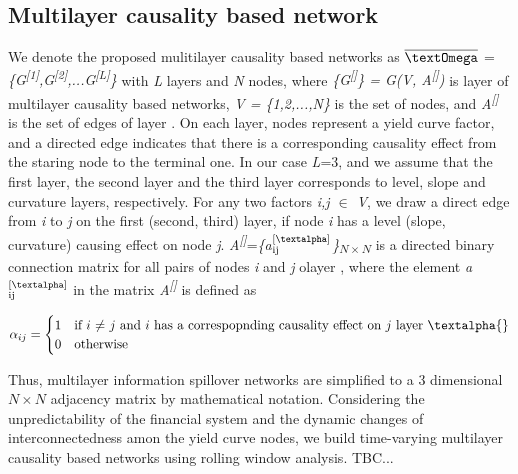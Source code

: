 \documentclass{article}
\begin{document}
\subsection{Multilayer causality based network}

We denote the proposed mulitilayer causality based networks as $\overline{\mbox{\textOmega}}$ = \textit{\{G\textsuperscript{[1]},G\textsuperscript{[2]},...G\textsuperscript{[L]}\}}
with \textit{L} layers and \textit{N} nodes, where \textit{\{G\textsuperscript{[\textalpha]}\} = G(V, A\textsuperscript{[\textalpha]})} is layer \textit{\textalpha{}} of multilayer causality based networks, \textit{V = \{1,2,...,N\}}
is the set of nodes, and  \textit{A\textsuperscript{[\textalpha]}} is the set of edges of layer \textit{\textalpha}. On each layer, nodes represent a yield curve factor, and a directed edge indicates that there is a corresponding causality effect from the staring node to the terminal one. In our case \textit{L}=3, and we assume that the first layer, the second layer and the third layer corresponds to level, slope and curvature layers, respectively.
For any two factors \textit{i,j $\in$ V}, we draw a direct edge from \textit{i} to \textit{j} on the first (second, third) layer, if node \textit{i} has a level (slope, curvature) causing effect on node \textit{j}.
\textit{A\textsuperscript{[\textalpha]}}=\textit{\{{a$^{\text{[\textalpha]}}_{\text{ij}}$\}\textsubscript{$N\times N$}}} is a directed binary connection matrix for all pairs of nodes \textit{i} and \textit{j} olayer \textit{\textalpha{}}, where the element \textit{a$^{\text{[\textalpha]}}_{\text{ij}}$} in the matrix \textit{A\textsuperscript{[\textalpha]}} is defined as

\begin{equation}
  \alpha_{ij} =
    \begin{cases}
      1 & \text{if $i$ $\neq$ $j$ and $i$ has a correspopnding causality effect on $j$ layer \textalpha{}}\\
      0 & \text{otherwise}
    \end{cases}       
\end{equation}

Thus, multilayer information spillover networks are simplified to a 3 dimensional $N\times N$ adjacency matrix by mathematical notation. Considering the unpredictability of the financial system and the dynamic changes of interconnectedness amon the yield curve nodes, we build time-varying multilayer causality based networks using rolling window analysis. TBC...
\end{document}

